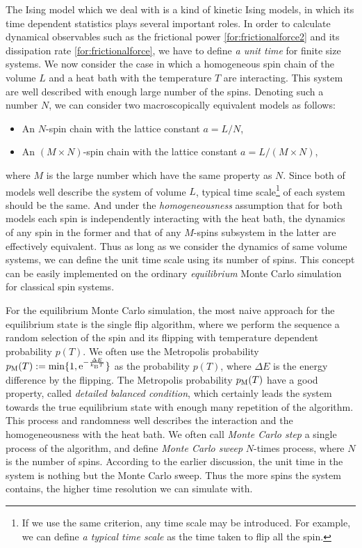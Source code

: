 The Ising model which we deal with is a kind of kinetic Ising models\cite{Glauber1963}, in which its time dependent statistics plays several important roles. In order to calculate dynamical observables such as the frictional power \eqref{for:frictionalforce2} and its dissipation rate \eqref{for:frictionalforce}, we have to define \textit{a unit time} for finite size systems. We now consider the case in which a homogeneous spin chain of the volume $L$ and a heat bath with the temperature $T$ are interacting. This system are well described with enough large number of the spins. Denoting such a number $N$, we can consider two macroscopically equivalent models as follows:
\begin{itemize}
	\item An $N$-spin chain with the lattice constant $a=L/N$,
	\item An $(M\times N)$-spin chain with the lattice constant $a=L/(M\times N)$,
\end{itemize}
where $M$ is the large number which have the same property as $N$. Since both of models well describe the system of volume $L$, typical time scale\footnote{If we use the same criterion, any time scale may be introduced. For example, we can define \textit{a typical time scale} as the time taken to flip all the spin.} of each system should be the same. And under the \textit{homogeneousness} assumption that for both models each spin is independently interacting with the heat bath, the dynamics of any spin in the former and that of any $M$-spins subsystem in the latter are effectively equivalent. Thus as long as we consider the dynamics of same volume systems, we can define the unit time scale using its number of spins. This concept can be easily implemented on the ordinary \textit{equilibrium} Monte Carlo simulation for classical spin systems.

For the equilibrium Monte Carlo simulation, the most naive approach for the equilibrium state is the single flip algorithm, where we perform the sequence a random selection of the spin and its flipping with temperature dependent probability $p(T)$. We often use the Metropolis probability $p_{\rm M}(T):=\min\{1,\mathrm{e}^{-\frac{\Delta E}{k_{\rm B}T}}\}$ as the probability $p(T)$, where $\Delta E$ is the energy difference by the flipping. The Metropolis probability $ p_{\rm M}(T) $ have a good property, called \textit{detailed balanced condition}, which certainly leads the system towards the true equilibrium state with enough many repetition of the algorithm. This process and randomness well describes the interaction and the homogeneousness with the heat bath. We often call \textit{Monte Carlo step} a single process of the algorithm, and define \textit{Monte Carlo sweep} $N$-times process, where $N$ is the number of spins. According to the earlier discussion, the unit time in the system is nothing but the Monte Carlo sweep. Thus the more spins the system contains, the higher time resolution we can simulate with.

